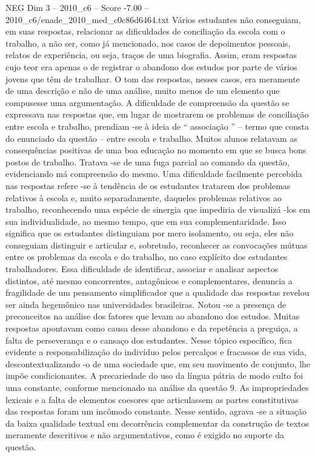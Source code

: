 \begin{textsample}{NEG Dim 3 – 2010\_c6 – Score -7.00 – 2010\_c6/enade\_2010\_med\_c0c86d6464.txt}
Vários estudantes não conseguiam, em suas respostas, relacionar as dificuldades de conciliação da escola com o trabalho, a não ser, como já mencionado, nos casos de depoimentos pessoais, relatos de experiência, ou seja, traços de uma biografia.
Assim, eram respostas cujo teor era apenas o de registrar o abandono dos estudos por parte de vários jovens que têm de trabalhar.
O tom das respostas, nesses casos, era meramente de uma descrição e não de uma análise, muito menos de um elemento que compusesse uma argumentação.
A dificuldade de compreensão da questão se expressava nas respostas que, em lugar de mostrarem os problemas de conciliação entre escola e trabalho, prendiam -se à ideia de “ associação ” – termo que consta do enunciado da questão – entre escola e trabalho.
Muitos alunos relatavam as consequências positivas de uma boa educação no momento em que se busca bons postos de trabalho.
Tratava -se de uma fuga parcial ao comando da questão, evidenciando má compreensão do mesmo.
Uma dificuldade facilmente percebida nas respostas refere -se à tendência de os estudantes tratarem dos problemas relativos à escola e, muito separadamente, daqueles problemas relativos ao trabalho, reconhecendo uma espécie de sinergia que impediria de visualizá -los em sua individualidade, ao mesmo tempo, que em sua complementaridade.
Isso significa que os estudantes distinguiam por mero isolamento, ou seja, eles não conseguiam distinguir e articular e, sobretudo, reconhecer as convocações mútuas entre os problemas da escola e do trabalho, no caso explícito dos estudantes trabalhadores.
Essa dificuldade de identificar, associar e analisar aspectos distintos, até mesmo concorrentes, antagônicos e complementares, denuncia a fragilidade de um pensamento simplificador que a qualidade das respostas revelou ser ainda hegemônico nas universidades brasileiras.
Notou -se a presença de preconceitos na análise dos fatores que levam ao abandono dos estudos.
Muitas respostas apontavam como causa desse abandono e da repetência a preguiça, a falta de perseverança e o cansaço dos estudantes.
Nesse tópico específico, fica evidente a responsabilização do indivíduo pelos percalços e fracassos de sua vida, descontextualizando -o de uma sociedade que, em seu movimento de conjunto, lhe impõe condicionantes.
A precariedade do uso da língua pátria de modo culto foi uma constante, conforme mencionado na análise da questão 9.
As impropriedades lexicais e a falta de elementos coesores que articulassem as partes constitutivas das respostas foram um incômodo constante.
Nesse sentido, agrava -se a situação da baixa qualidade textual em decorrência complementar da construção de textos meramente descritivos e não argumentativos, como é exigido no suporte da questão.

\end{textsample}
